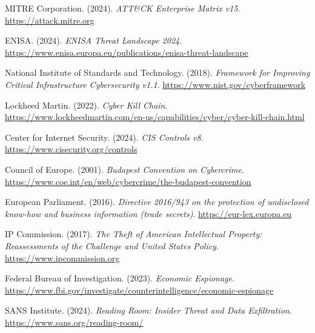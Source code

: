 \documentclass[11pt,a4paper]{article}
\begin{document}
\begin{enumerate}[label={[\arabic*]}, leftmargin=*, nosep]
  \item MITRE Corporation. (2024). \textit{ATT\&CK Enterprise Matrix v15}. \url{https://attack.mitre.org}
  \item ENISA. (2024). \textit{ENISA Threat Landscape 2024}. \url{https://www.enisa.europa.eu/publications/enisa-threat-landscape}
  \item National Institute of Standards and Technology. (2018). \textit{Framework for Improving Critical Infrastructure Cybersecurity v1.1}. \url{https://www.nist.gov/cyberframework}
  \item Lockheed Martin. (2022). \textit{Cyber Kill Chain}. \url{https://www.lockheedmartin.com/en-us/capabilities/cyber/cyber-kill-chain.html}
  \item Center for Internet Security. (2024). \textit{CIS Controls v8}. \url{https://www.cisecurity.org/controls}
  \item Council of Europe. (2001). \textit{Budapest Convention on Cybercrime}. \url{https://www.coe.int/en/web/cybercrime/the-budapest-convention}
  \item European Parliament. (2016). \textit{Directive 2016/943 on the protection of undisclosed know-how and business information (trade secrets)}. \url{https://eur-lex.europa.eu}
  \item IP Commission. (2017). \textit{The Theft of American Intellectual Property: Reassessments of the Challenge and United States Policy}. \url{https://www.ipcommission.org}
  \item\label{fbi2023} Federal Bureau of Investigation. (2023). \textit{Economic Espionage}. \url{https://www.fbi.gov/investigate/counterintelligence/economic-espionage}
  \item SANS Institute. (2024). \textit{Reading Room: Insider Threat and Data Exfiltration}. \url{https://www.sans.org/reading-room/}
\end{enumerate}
\end{document}
